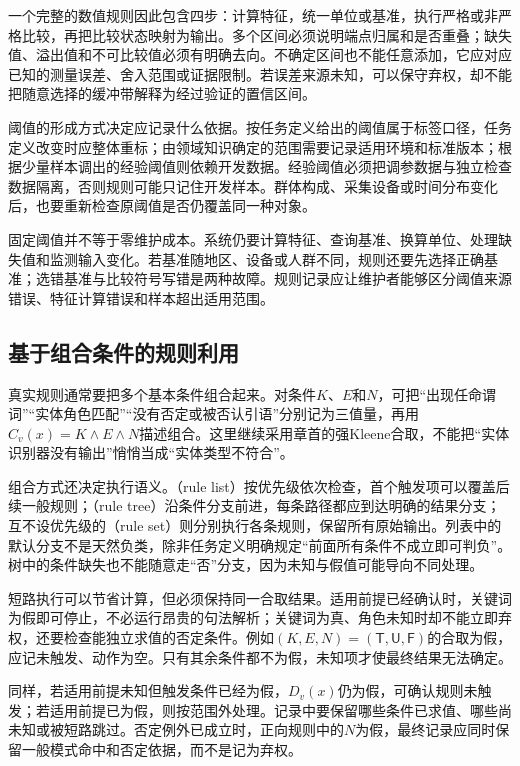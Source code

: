 一个完整的数值规则因此包含四步：计算特征，统一单位或基准，执行严格或非严格比较，再把比较状态映射为输出。多个区间必须说明端点归属和是否重叠；缺失值、溢出值和不可比较值必须有明确去向。不确定区间也不能任意添加，它应对应已知的测量误差、舍入范围或证据限制。若误差来源未知，可以保守弃权，却不能把随意选择的缓冲带解释为经过验证的置信区间。

阈值的形成方式决定应记录什么依据。按任务定义给出的阈值属于标签口径，任务定义改变时应整体重标；由领域知识确定的范围需要记录适用环境和标准版本；根据少量样本调出的经验阈值则依赖开发数据。经验阈值必须把调参数据与独立检查数据隔离，否则规则可能只记住开发样本。群体构成、采集设备或时间分布变化后，也要重新检查原阈值是否仍覆盖同一种对象。

固定阈值并不等于零维护成本。系统仍要计算特征、查询基准、换算单位、处理缺失值和监测输入变化。若基准随地区、设备或人群不同，规则还要先选择正确基准；选错基准与比较符号写错是两种故障。规则记录应让维护者能够区分阈值来源错误、特征计算错误和样本超出适用范围。

\subsection{基于组合条件的规则利用}
\label{sec:rule-based-knowledge-acquisition-composite-pattern}

真实规则通常要把多个基本条件组合起来。对条件$K$、$E$和$N$，可把“出现任命谓词”“实体角色匹配”“没有否定或被否认引语”分别记为三值量，再用$C_v(x)=K\land E\land N$描述组合。这里继续采用章首的强Kleene合取，不能把“实体识别器没有输出”悄悄当成“实体类型不符合”。

组合方式还决定执行语义。（rule list）按优先级依次检查，首个触发项可以覆盖后续一般规则；（rule tree）沿条件分支前进，每条路径都应到达明确的结果分支；互不设优先级的（rule set）则分别执行各条规则，保留所有原始输出。列表中的默认分支不是天然负类，除非任务定义明确规定“前面所有条件不成立即可判负”。树中的条件缺失也不能随意走“否”分支，因为未知与假值可能导向不同处理。

短路执行可以节省计算，但必须保持同一合取结果。适用前提已经确认时，关键词为假即可停止，不必运行昂贵的句法解析；关键词为真、角色未知时却不能立即弃权，还要检查能独立求值的否定条件。例如$(K,E,N)=(\mathsf{T},\mathsf{U},\mathsf{F})$的合取为假，应记未触发、动作为空。只有其余条件都不为假，未知项才使最终结果无法确定。

同样，若适用前提未知但触发条件已经为假，$D_v(x)$仍为假，可确认规则未触发；若适用前提已为假，则按范围外处理。记录中要保留哪些条件已求值、哪些尚未知或被短路跳过。否定例外已成立时，正向规则中的$N$为假，最终记录应同时保留一般模式命中和否定依据，而不是记为弃权。


